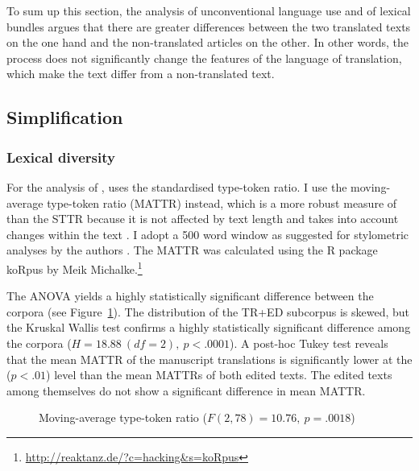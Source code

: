 \documentclass[output=paper]{LSP/langsci}
\begin{document}
To sum up this section, the analysis of unconventional language use and of lexical bundles argues that there are greater differences between the two translated texts on the one hand and the non-translated articles on the other. In other words, the  process does not significantly change the features of the language of translation, which make the text differ from a non-translated text.

\subsection{Simplification}\label{bisiada:sec:simp}

\subsubsection{Lexical diversity}

For the analysis of , \textcite{kruger12} uses the standardised type-token ratio. I use the moving-average type-token ratio (MATTR) instead, which is a more robust measure of  than the STTR because it is not affected by text length and takes into account changes within the text \parencite[96]{covmcf10}. I adopt a 500 word window as suggested for stylometric analyses by the authors \parencite[97]{covmcf10}. The MATTR was calculated using the R package koRpus by Meik Michalke.\footnote{\url{http://reaktanz.de/?c=hacking&s=koRpus}}

The ANOVA yields a highly statistically significant difference between the corpora (see Figure~\ref{bisiada:fig:mattr}). The distribution of the TR+ED subcorpus is skewed, but the Kruskal Wallis test confirms a highly statistically significant difference among the corpora ($H=18.88~(df=2),~p<.0001$). A post-hoc Tukey test reveals that the mean MATTR of the manuscript translations is significantly lower at the ($p<.01$) level than the mean MATTRs of both edited texts. The edited texts among themselves do not show a significant difference in mean MATTR.

\begin{figure}
  \caption{Moving-average type-token ratio ($F(2,78)=10.76,~p=.0018$)}\label{bisiada:fig:mattr}
\end{figure}
\end{document}
